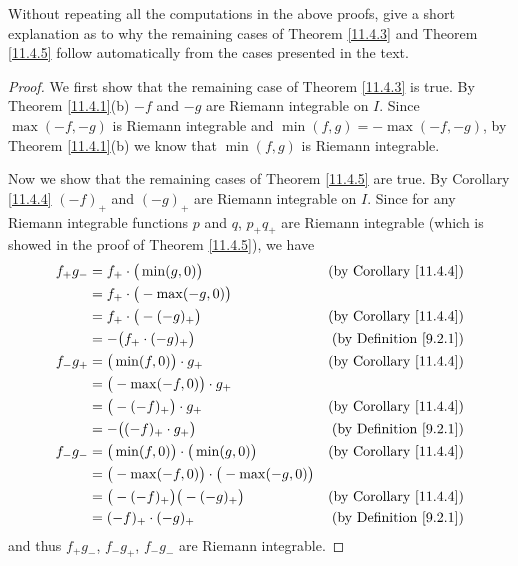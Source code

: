 \begin{exercise}\label{ex 11.4.4}
    Without repeating all the computations in the above proofs, give a short explanation as to why the remaining cases of Theorem \ref{11.4.3} and Theorem \ref{11.4.5} follow automatically from the cases presented in the text.
\end{exercise}

\begin{proof}
    We first show that the remaining case of Theorem \ref{11.4.3} is true.
    By Theorem \ref{11.4.1}(b) \(-f\) and \(-g\) are Riemann integrable on \(I\).
    Since \(\max(-f, -g)\) is Riemann integrable and \(\min(f, g) = -\max(-f, -g)\), by Theorem \ref{11.4.1}(b) we know that \(\min(f, g)\) is Riemann integrable.

    Now we show that the remaining cases of Theorem \ref{11.4.5} are true.
    By Corollary \ref{11.4.4} \((-f)_+\) and \((-g)_+\) are Riemann integrable on \(I\).
    Since for any Riemann integrable functions \(p\) and \(q\), \(p_+ q_+\) are Riemann integrable (which is showed in the proof of Theorem \ref{11.4.5}), we have
    \begin{align*}
        f_+ g_- & = f_+ \cdot \big(\min(g, 0)\big)                      & \text{(by Corollary \ref{11.4.4})} \\
                & = f_+ \cdot \big(-\max(-g, 0)\big)                                                         \\
                & = f_+ \cdot \big(-(-g)_+\big)                         & \text{(by Corollary \ref{11.4.4})} \\
                & = -\big(f_+ \cdot (-g)_+\big)                         & \text{(by Definition \ref{9.2.1})} \\
        f_- g_+ & = \big(\min(f, 0)\big) \cdot g_+                      & \text{(by Corollary \ref{11.4.4})} \\
                & = \big(-\max(-f, 0)\big) \cdot g_+                                                         \\
                & = \big(-(-f)_+\big) \cdot g_+                         & \text{(by Corollary \ref{11.4.4})} \\
                & = -\big((-f)_+ \cdot g_+\big)                         & \text{(by Definition \ref{9.2.1})} \\
        f_- g_- & = \big(\min(f, 0)\big) \cdot \big(\min(g, 0)\big)     & \text{(by Corollary \ref{11.4.4})} \\
                & = \big(-\max(-f, 0)\big) \cdot \big(-\max(-g, 0)\big)                                      \\
                & = \big(-(-f)_+\big) \big(-(-g)_+\big)                 & \text{(by Corollary \ref{11.4.4})} \\
                & = (-f)_+ \cdot (-g)_+                                 & \text{(by Definition \ref{9.2.1})}
    \end{align*}
    and thus \(f_+ g_-\), \(f_- g_+\), \(f_- g_-\) are Riemann integrable.
\end{proof}